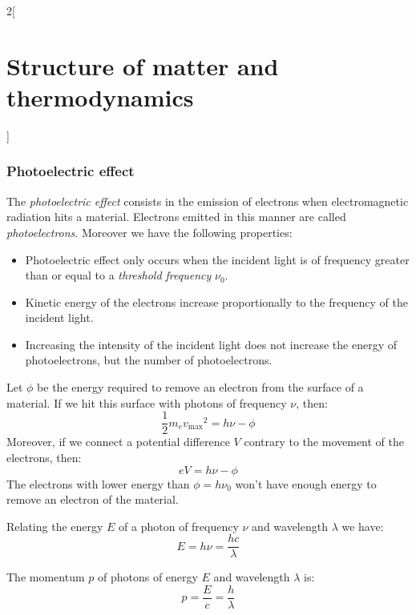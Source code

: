 \documentclass[../../../main.tex]{subfiles}
\begin{document}
\begin{multicols}{2}[\section{Structure of matter and thermodynamics}]
\begin{proposition}
  \end{proposition}
  \begin{center}
    \begin{minipage}{\linewidth}
      \centering
      
    \end{minipage}
  \end{center}
  \subsubsection{Photoelectric effect}
  \begin{definition}
    The \emph{photoelectric effect} consists in the emission of electrons when electromagnetic radiation hits a material. Electrons emitted in this manner are called \emph{photoelectrons}. Moreover we have the following properties:
    \begin{itemize}
      \item Photoelectric effect only occurs when the incident light is of frequency greater than or equal to a \emph{threshold frequency} $\nu_0$.
      \item Kinetic energy of the electrons increase proportionally to the frequency of the incident light.
      \item Increasing the intensity of the incident light does not increase the energy of photoelectrons, but the number of photoelectrons.
    \end{itemize}
  \end{definition}
  \begin{proposition}
    Let $\phi$ be the energy required to remove an electron from the surface of a material. If we hit this surface with photons of frequency $\nu$, then: $$\frac{1}{2}m_e{v_\text{max}}^2=h\nu-\phi$$ Moreover, if we connect a potential difference $V$ contrary to the movement of the electrons, then: $$eV=h\nu-\phi$$ The electrons with lower energy than $\phi=h\nu_0$ won't have enough energy to remove an electron of the material.
  \end{proposition}
  \begin{proposition}
    Relating the energy $E$ of a photon of frequency $\nu$ and wavelength $\lambda$ we have: $$E=h\nu=\frac{hc}{\lambda}$$
  \end{proposition}
  \begin{proposition}
    The momentum $p$ of photons of energy $E$ and wavelength $\lambda$ is: $$p=\frac{E}{c}=\frac{h}{\lambda}$$
  \end{proposition}

\end{multicols}
\end{document}
